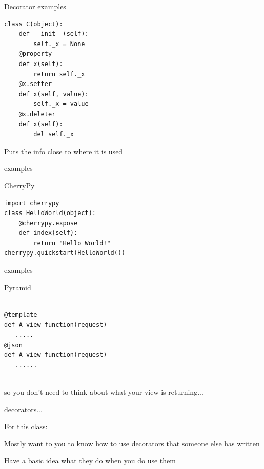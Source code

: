 \documentclass{beamer}
\begin{document}
\begin{frame}[fragile]{Decorator examples}

\begin{verbatim}
class C(object):
    def __init__(self):
        self._x = None
    @property
    def x(self):
        return self._x
    @x.setter
    def x(self, value):
        self._x = value
    @x.deleter
    def x(self):
        del self._x
\end{verbatim}

\vfill
Puts the info close to where it is used
\end{frame} 

\begin{frame}[fragile]{examples}

{\LARGE CherryPy}

\vfill
\begin{verbatim}
import cherrypy
class HelloWorld(object):
    @cherrypy.expose
    def index(self):
        return "Hello World!"
cherrypy.quickstart(HelloWorld())
\end{verbatim}

\end{frame} 

\begin{frame}[fragile]{examples}

{\LARGE Pyramid}

\vfill
\begin{verbatim}

@template
def A_view_function(request)
   .....
@json
def A_view_function(request)
   ......


\end{verbatim}

so you don't need to think about what your view is returning...

\end{frame} 


\begin{frame}[fragile]{decorators...}

{\Large For this class:}

\vfill
{\Large Mostly want to you to know how to use decorators that someone else has written}

\vfill
{\Large Have a basic idea what they do when you do use them}

\end{frame} 
\end{document}
